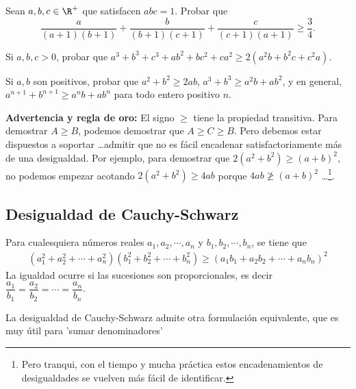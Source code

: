 \begin{exercise}
    Sean $a, b, c \in \R^+$ que satisfacen $abc = 1$.
    Probar que
    \[\frac{a}{(a + 1)(b + 1)} + \frac{b}{(b + 1)(c + 1)} + \frac{c}{(c + 1)(a + 1)} \geq \frac{3}{4}.\]
\end{exercise}

\begin{exercise}
    Si $a, b, c > 0$, probar que $a^3 + b^3 + c^3 + ab^2 + bc^2 + ca^2 \geq 2(a^2 b + b^2 c + c^2 a)$.
\end{exercise}

\begin{exercise}
    Si $a,b$ son positivos, probar que $a^2 + b^2 \geq 2ab$, $a^3 + b^3 \geq a^2 b + ab^2$, y en general, $a^{n +  1} + b^{n + 1} \geq a^n b + a b^n$ para todo entero positivo $n$.
\end{exercise}

\textbf{Advertencia y regla de oro:} El signo $\geq$ tiene la propiedad transitiva.
Para demostrar $A \geq B$, podemos demostrar que $A \geq C \geq B$.
Pero debemos estar dispuestos a soportar \ldots admitir que no es fácil encadenar satisfactoriamente más de una desigualdad.
Por ejemplo, para demostrar que $2(a^2 + b^2) \geq (a + b)^2$, no podemos empezar acotando $2(a^2 + b^2) \geq 4ab$ porque $4ab \ngeq (a + b)^2$
\ldots\footnote{Pero tranqui, con el tiempo y mucha práctica estos encadenamientos de desigualdades se vuelven más fácil de identificar.}.


\vspace{-4mm}
\subsection{Desigualdad de Cauchy-Schwarz}

\begin{theorem}
    Para cualesquiera números reales $a_1, a_2, \cdots, a_n$ y $b_1, b_2, \cdots, b_n$, se tiene que
    \begin{gather*}
        \boxed
        {
            \left(a_1^2 + a_2^2 + \cdots + a_n^2\right)\left(b_1^2 + b_2^2 + \cdots + b_n^2\right) \geq \left(a_1 b_1 + a_2 b_2 + \cdots + a_n b_n\right)^2
        }
    \end{gather*}
    La igualdad ocurre si las sucesiones son proporcionales, es decir $\dfrac{a_1}{b_1} = \dfrac{a_2}{b_2} = \cdots = \dfrac{a_n}{b_n}$.
\end{theorem}

La desigualdad de Cauchy-Schwarz admite otra formulación equivalente, que es muy útil para 'sumar denominadores'

